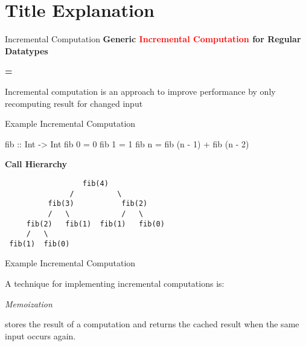 \section{Title Explanation}


\begin{slide}{Incremental Computation}
\centering
\large \textbf{Generic \textcolor{red}{Incremental Computation} for Regular Datatypes}

\vspace*{.5cm}
\textbf{=}
\vspace*{.5cm}

Incremental computation is an approach to improve performance by only recomputing result for changed input

\end{slide}


\begin{slide}{Example Incremental Computation}
\begin{haskell}
fib :: Int -> Int
fib 0 = 0
fib 1 = 1
fib n = fib (n - 1) + fib (n - 2)
\end{haskell}
\begin{center}  
\textbf{Call Hierarchy}

\vspace*{.2cm}
\begin{verbatim}
                  fib(4)  
               /          \
          fib(3)           fib(2)
          /   \            /   \
     fib(2)   fib(1)  fib(1)   fib(0)
     /   \
 fib(1)  fib(0)
\end{verbatim}
\end{center}
\end{slide}

\begin{slide}{Example Incremental Computation}

\centering
A technique for implementing incremental computations is:

\vspace*{0.4cm}

{\huge \textit{Memoization}}

\vspace*{0.4cm}

stores the result of a computation and returns the cached result when the same input occurs again.

\end{slide}

